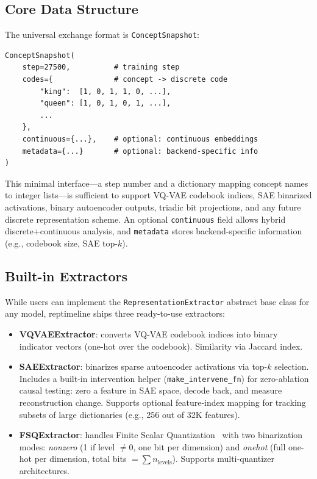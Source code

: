 \documentclass[11pt]{article}
\begin{document}
\subsection{Core Data Structure}

The universal exchange format is \texttt{ConceptSnapshot}:

\begin{lstlisting}
ConceptSnapshot(
    step=27500,          # training step
    codes={              # concept -> discrete code
        "king":  [1, 0, 1, 1, 0, ...],
        "queen": [1, 0, 1, 0, 1, ...],
        ...
    },
    continuous={...},    # optional: continuous embeddings
    metadata={...}       # optional: backend-specific info
)
\end{lstlisting}

This minimal interface---a step number and a dictionary mapping concept names to integer lists---is sufficient to support VQ-VAE codebook indices, SAE binarized activations, binary autoencoder outputs, triadic bit projections, and any future discrete representation scheme. An optional \texttt{continuous} field allows hybrid discrete+continuous analysis, and \texttt{metadata} stores backend-specific information (e.g., codebook size, SAE top-$k$).

\subsection{Built-in Extractors}
\label{sec:extractors}

While users can implement the \texttt{RepresentationExtractor} abstract base class for any model, reptimeline ships three ready-to-use extractors:

\begin{itemize}[nosep]
    \item \textbf{VQVAEExtractor}: converts VQ-VAE codebook indices into binary indicator vectors (one-hot over the codebook). Similarity via Jaccard index.
    \item \textbf{SAEExtractor}: binarizes sparse autoencoder activations via top-$k$ selection.
    Includes a built-in intervention helper (\texttt{make\_inter\-vene\_fn}) for zero-ablation causal testing: zero a feature in SAE space, decode back, and measure reconstruction change.
    Supports optional feature-index mapping for tracking subsets of large dictionaries (e.g., 256 out of 32K features).
    \item \textbf{FSQExtractor}: handles Finite Scalar Quantization~\citep{mentzer2024finite} with two binarization modes: \emph{nonzero} (1 if level $\neq 0$, one bit per dimension) and \emph{onehot} (full one-hot per dimension, total bits $= \sum n_{\text{levels}}$). Supports multi-quantizer architectures.
\end{itemize}
\end{document}
